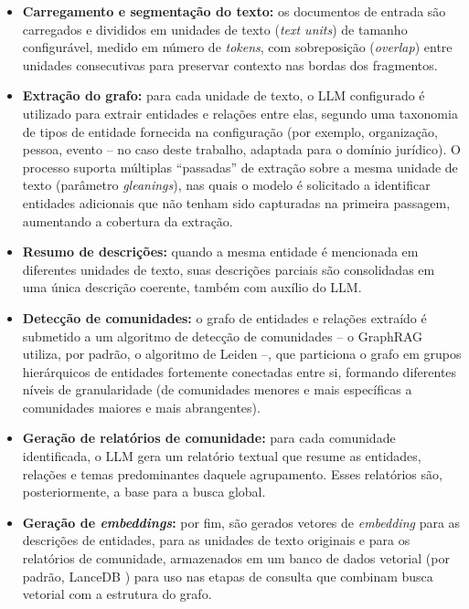 \begin{itemize}
    \item \textbf{Carregamento e segmentação do texto:} os documentos de
    entrada são carregados e divididos em unidades de texto
    (\textit{text units}) de tamanho configurável, medido em número de
    \textit{tokens}, com sobreposição (\textit{overlap}) entre unidades
    consecutivas para preservar contexto nas bordas dos fragmentos.

    \item \textbf{Extração do grafo:} para cada unidade de texto, o LLM
    configurado é utilizado para extrair entidades e relações entre elas,
    segundo uma taxonomia de tipos de entidade fornecida na configuração
    (por exemplo, organização, pessoa, evento -- no caso deste trabalho,
    adaptada para o domínio jurídico). O processo suporta múltiplas
    ``passadas'' de extração sobre a mesma unidade de texto (parâmetro
    \textit{gleanings}), nas quais o modelo é solicitado a identificar
    entidades adicionais que não tenham sido capturadas na primeira
    passagem, aumentando a cobertura da extração.

    \item \textbf{Resumo de descrições:} quando a mesma entidade é
    mencionada em diferentes unidades de texto, suas descrições parciais são
    consolidadas em uma única descrição coerente, também com auxílio do LLM.

    \item \textbf{Detecção de comunidades:} o grafo de entidades e relações
    extraído é submetido a um algoritmo de detecção de comunidades -- o
    GraphRAG utiliza, por padrão, o algoritmo de Leiden \cite{traag2019louvain} --, que particiona o
    grafo em grupos hierárquicos de entidades fortemente conectadas entre si,
    formando diferentes níveis de granularidade (de comunidades menores e mais
    específicas a comunidades maiores e mais abrangentes).

    \item \textbf{Geração de relatórios de comunidade:} para cada comunidade
    identificada, o LLM gera um relatório textual que resume as entidades,
    relações e temas predominantes daquele agrupamento. Esses relatórios são,
    posteriormente, a base para a busca global.

    \item \textbf{Geração de \textit{embeddings}:} por fim, são gerados
    vetores de \textit{embedding} para as descrições de entidades, para as
    unidades de texto originais e para os relatórios de comunidade,
    armazenados em um banco de dados vetorial (por padrão, LanceDB \cite{lancedb}) para uso
    nas etapas de consulta que combinam busca vetorial com a estrutura do
    grafo.
\end{itemize}

